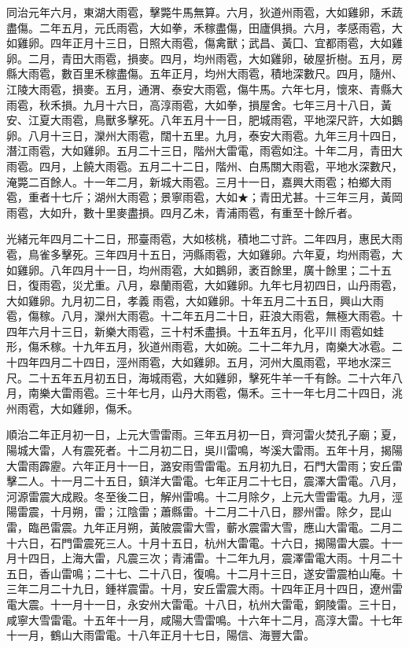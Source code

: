 \begin{pinyinscope}
同治元年六月，東湖大雨雹，擊斃牛馬無算。六月，狄道州雨雹，大如雞卵，禾蔬盡傷。二年五月，元氏雨雹，大如拳，禾稼盡傷，田廬俱損。六月，孝感雨雹，大如雞卵。四年正月十三日，日照大雨雹，傷禽獸；武昌、黃囗、宜都雨雹，大如雞卵。二月，青田大雨雹，損麥。四月，均州雨雹，大如雞卵，破屋折樹。五月，房縣大雨雹，數百里禾稼盡傷。五年正月，均州大雨雹，積地深數尺。四月，隨州、江陵大雨雹，損麥。五月，通渭、泰安大雨雹，傷牛馬。六年七月，懷來、青縣大雨雹，秋禾損。九月十六日，高淳雨雹，大如拳，損屋舍。七年三月十八日，黃安、江夏大雨雹，鳥獸多擊死。八年五月十一日，肥城雨雹，平地深尺許，大如鵝卵。八月十三日，灤州大雨雹，闊十五里。九月，泰安大雨雹。九年三月十四日，潛江雨雹，大如雞卵。五月二十三日，階州大雷電，雨雹如注。十年二月，青田大雨雹。四月，上饒大雨雹。五月二十二日，階州、白馬關大雨雹，平地水深數尺，淹斃二百餘人。十一年二月，新城大雨雹。三月十一日，嘉興大雨雹；柏鄉大雨雹，重者十七斤；湖州大雨雹；景寧雨雹，大如★；青田尤甚。十三年三月，黃岡雨雹，大如升，數十里麥盡損。四月乙未，青浦雨雹，有重至十餘斤者。

光緒元年四月二十二日，邢臺雨雹，大如核桃，積地二寸許。二年四月，惠民大雨雹，鳥雀多擊死。三年四月十五日，沔縣雨雹，大如雞卵。六年夏，均州雨雹，大如雞卵。八年四月十一日，均州雨雹，大如鵝卵，袤百餘里，廣十餘里；二十五日，復雨雹，災尤重。八月，皋蘭雨雹，大如雞卵。九年七月初四日，山丹雨雹，大如雞卵。九月初二日，孝義雨雹，大如雞卵。十年五月二十五日，興山大雨雹，傷稼。八月，灤州大雨雹。十二年五月二十日，莊浪大雨雹，無極大雨雹。十四年六月十三日，新樂大雨雹，三十村禾盡損。十五年五月，化平川雨雹如蛙形，傷禾稼。十九年五月，狄道州雨雹，大如碗。二十二年九月，南樂大冰雹。二十四年四月二十四日，涇州雨雹，大如雞卵。五月，河州大風雨雹，平地水深三尺。二十五年五月初五日，海城雨雹，大如雞卵，擊死牛羊一千有餘。二十六年八月，南樂大雷雨雹。三十年七月，山丹大雨雹，傷禾。三十一年七月二十四日，洮州雨雹，大如雞卵，傷禾。

順治二年正月初一日，上元大雪雷雨。三年五月初一日，齊河雷火焚孔子廟；夏，陽城大雷，人有震死者。十二月初二日，吳川雷鳴，岑溪大雷雨。五年十月，揭陽大雷雨霹靂。六年正月十一日，潞安雨雪雷電。五月初九日，石門大雷雨；安丘雷擊二人。十一月二十五日，鎮洋大雷電。七年正月二十七日，震澤大雷電。八月，河源雷震大成殿。冬至後二日，解州雷鳴。十二月除夕，上元大雪雷電。九月，涇陽雷震，十月朔，雷；江陰雷；蕭縣雷。十二月二十八日，膠州雷。除夕，昆山雷，臨邑雷震。九年正月朔，黃陂震雷大雪，蘄水震雷大雪，應山大雷電。二月二十六日，石門雷震死三人。十月十五日，杭州大雷電。十六日，揭陽雷大震。十一月十四日，上海大雷，凡震三次；青浦雷。十二年九月，震澤雷電大雨。十月二十五日，香山雷鳴；二十七、二十八日，復鳴。十二月十三日，遂安雷震柏山庵。十三年二月二十九日，鍾祥震雷。十月，安丘雷震大雨。十四年正月十四日，遼州雷電大震。十一月十一日，永安州大雷電。十八日，杭州大雷電，銅陵雷。三十日，咸寧大雪雷電。十五年十一月，咸陽大雪雷鳴。十六年十二月，高淳大雷。十七年十一月，鶴山大雨雷電。十八年正月十七日，陽信、海豐大雷。


\end{pinyinscope}
